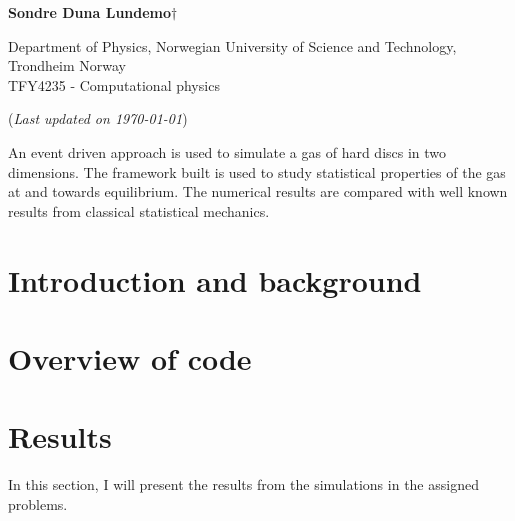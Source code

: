 


	
\begin{titlepage}
	\begin{center}
	\setlength{\parskip}{0em}
	\thispagestyle{titlepage}
	

	\vspace{4mm}
	
	\large{\textbf{Sondre Duna Lundemo}}$\dagger$
	
	\normalsize{Department of Physics, Norwegian University of Science and Technology, Trondheim Norway \\
	TFY4235 - Computational physics
	}

	(\textit{Last updated on \today})
	\end{center}

	\setlength{\parindent}{2em}An event driven approach is used to simulate a gas of hard discs in two dimensions. The framework built is used to study statistical properties of the gas at and towards equilibrium. The numerical results are compared with well known results from classical statistical mechanics. 
	
	

\end{titlepage}

\newpage
\setlength{\parskip}{0em}
\tableofcontents
\setlength{\parskip}{1em}
\newpage

\section{Introduction and background}\label{sec:intro}



\section{Overview of code}\label{sec:overview}



\newpage

\section{Results}

In this section, I will present the results from the simulations in the assigned problems.

